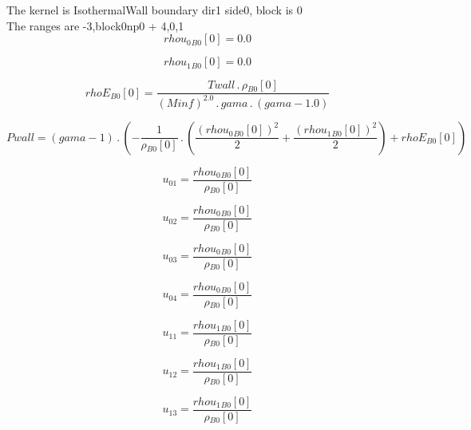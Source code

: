 \documentclass{article}
\begin{document}
\noindent The kernel is IsothermalWall boundary dir1 side0, block is 0\\\noindent The ranges are -3,block0np0 + 4,0,1\\\begin{dmath}{rhou_{0}{_{B0}}}[{0}] = 0.0\end{dmath}

\begin{dmath}{rhou_{1}{_{B0}}}[{0}] = 0.0\end{dmath}

\begin{dmath}{rhoE{_{B0}}}[{0}] = \frac{Twall \,.\, {\rho{_{B0}}}[{0}]}{\left(Minf \right)^{2.0} \,.\, gama \,.\, \left(gama - 1.0\right)}\end{dmath}

\begin{dmath}Pwall = \left(gama - 1\right) \,.\, \left(- \frac{1}{{\rho{_{B0}}}[{0}]} \,.\, \left(\frac{\left({rhou_{0}{_{B0}}}[{0}] \right)^{2}}{2} + \frac{\left({rhou_{1}{_{B0}}}[{0}] \right)^{2}}{2}\right) + {rhoE{_{B0}}}[{0}]\right)\end{dmath}

\begin{dmath}u_{01} = \frac{{rhou_{0}{_{B0}}}[{0}]}{{\rho{_{B0}}}[{0}]}\end{dmath}

\begin{dmath}u_{02} = \frac{{rhou_{0}{_{B0}}}[{0}]}{{\rho{_{B0}}}[{0}]}\end{dmath}

\begin{dmath}u_{03} = \frac{{rhou_{0}{_{B0}}}[{0}]}{{\rho{_{B0}}}[{0}]}\end{dmath}

\begin{dmath}u_{04} = \frac{{rhou_{0}{_{B0}}}[{0}]}{{\rho{_{B0}}}[{0}]}\end{dmath}

\begin{dmath}u_{11} = \frac{{rhou_{1}{_{B0}}}[{0}]}{{\rho{_{B0}}}[{0}]}\end{dmath}

\begin{dmath}u_{12} = \frac{{rhou_{1}{_{B0}}}[{0}]}{{\rho{_{B0}}}[{0}]}\end{dmath}

\begin{dmath}u_{13} = \frac{{rhou_{1}{_{B0}}}[{0}]}{{\rho{_{B0}}}[{0}]}\end{dmath}
\end{document}
